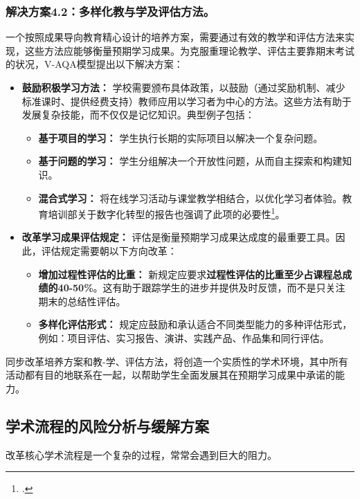 \subsubsection{解决方案4.2：多样化教与学及评估方法。}
一个按照成果导向教育精心设计的培养方案，需要通过有效的教学和评估方法来实现，这些方法应能够衡量预期学习成果。为克服重理论教学、评估主要靠期末考试的状况，V-AQA模型提出以下解决方案：

\begin{itemize}
    \item \textbf{鼓励积极学习方法：} 学校需要颁布具体政策，以鼓励（通过奖励机制、减少标准课时、提供经费支持）教师应用以学习者为中心的方法。这些方法有助于发展复杂技能，而不仅仅是记忆知识。典型例子包括：
    \begin{itemize}
        \item \textbf{基于项目的学习：} 学生执行长期的实际项目以解决一个复杂问题。
        \item \textbf{基于问题的学习：} 学生分组解决一个开放性问题，从而自主探索和构建知识。
        \item \textbf{混合式学习：} 将在线学习活动与课堂教学相结合，以优化学习者体验。教育培训部关于数字化转型的报告也强调了此项的必要性\footcite{moet_digital_transformation}。
    \end{itemize}
    
    \item \textbf{改革学习成果评估规定：} 评估是衡量预期学习成果达成度的最重要工具。因此，评估规定需要朝以下方向改革：
    \begin{itemize}
        \item \textbf{增加过程性评估的比重：} 新规定应要求\textbf{过程性评估的比重至少占课程总成绩的40-50\%}。这有助于跟踪学生的进步并提供及时反馈，而不是只关注期末的总结性评估。
        \item \textbf{多样化评估形式：} 规定应鼓励和承认适合不同类型能力的多种评估形式，例如：项目评估、实习报告、演讲、实践产品、作品集和同行评估。
    \end{itemize}
\end{itemize}

同步改革培养方案和教-学、评估方法，将创造一个实质性的学术环境，其中所有活动都有目的地联系在一起，以帮助学生全面发展其在预期学习成果中承诺的能力。

\subsection{学术流程的风险分析与缓解方案}
\label{subsec:risk_hocthuat}
改革核心学术流程是一个复杂的过程，常常会遇到巨大的阻力。

